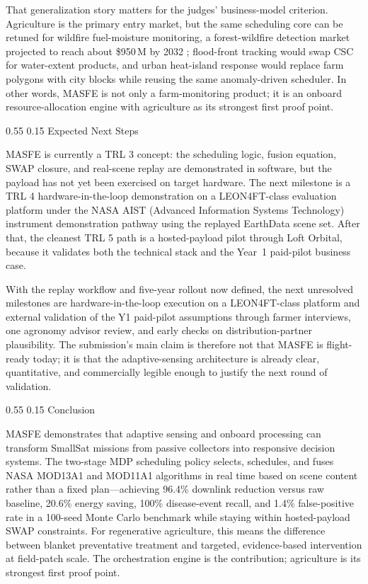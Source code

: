 \documentclass[11pt,letterpaper]{article}
\makeatletter
\renewcommand\section{\@startsection{section}{1}{\z@}
  {0.55\baselineskip}
  {0.15\baselineskip}
  {\normalfont\large\bfseries}}
\makeatother
\begin{document}
That generalization story matters for the judges' business-model criterion. Agriculture is the primary entry market, but the same scheduling core can be retuned for wildfire fuel-moisture monitoring, a forest-wildfire detection market projected to reach about \$950\,M by 2032 \cite{wildfire-market}; flood-front tracking would swap CSC for water-extent products, and urban heat-island response would replace farm polygons with city blocks while reusing the same anomaly-driven scheduler. In other words, MASFE is not only a farm-monitoring product; it is an onboard resource-allocation engine with agriculture as its strongest first proof point.

\section{Expected Next Steps}

MASFE is currently a TRL 3 concept: the scheduling logic, fusion equation, SWAP closure, and real-scene replay are demonstrated in software, but the payload has not yet been exercised on target hardware. The next milestone is a TRL 4 hardware-in-the-loop demonstration on a LEON4FT-class evaluation platform under the NASA AIST (Advanced Information Systems Technology) instrument demonstration pathway using the replayed EarthData scene set. After that, the cleanest TRL 5 path is a hosted-payload pilot through Loft Orbital, because it validates both the technical stack and the Year~1 paid-pilot business case.

With the replay workflow and five-year rollout now defined, the next unresolved milestones are hardware-in-the-loop execution on a LEON4FT-class platform and external validation of the Y1 paid-pilot assumptions through farmer interviews, one agronomy advisor review, and early checks on distribution-partner plausibility. The submission's main claim is therefore not that MASFE is flight-ready today; it is that the adaptive-sensing architecture is already clear, quantitative, and commercially legible enough to justify the next round of validation.

\section{Conclusion}

\label{chapter:conclusion}

MASFE demonstrates that adaptive sensing and onboard processing can transform SmallSat missions from passive collectors into responsive decision systems. The two-stage MDP scheduling policy selects, schedules, and fuses NASA MOD13A1 and MOD11A1 algorithms in real time based on scene content rather than a fixed plan---achieving 96.4\% downlink reduction versus raw baseline, 20.6\% energy saving, 100\% disease-event recall, and 1.4\% false-positive rate in a 100-seed Monte Carlo benchmark while staying within hosted-payload SWAP constraints. For regenerative agriculture, this means the difference between blanket preventative treatment and targeted, evidence-based intervention at field-patch scale. The orchestration engine is the contribution; agriculture is its strongest first proof point.
\end{document}
